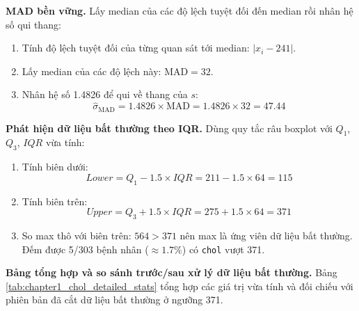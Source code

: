 \noindent\textbf{MAD bền vững.} Lấy median của các độ lệch tuyệt đối đến median rồi nhân hệ số qui thang:
\begin{enumerate}[leftmargin=2.2em,label=\textbf{\arabic*.}]
 \item Tính độ lệch tuyệt đối của từng quan sát tới median: $|x_i-241|$.
 \item Lấy median của các độ lệch này: $\text{MAD}=32$.
 \item Nhân hệ số 1.4826 để qui về thang của $s$:
 \begin{equation}
 \hat{\sigma}_{\text{MAD}} = 1.4826 \times \text{MAD} = 1.4826 \times 32 = 47.44
 \end{equation}
\end{enumerate}

\noindent\textbf{Phát hiện dữ liệu bất thường theo IQR.} Dùng quy tắc râu boxplot với $Q_1$, $Q_3$, $IQR$ vừa tính:
\begin{enumerate}[leftmargin=2.2em,label=\textbf{\arabic*.}]
 \item Tính biên dưới:
 \begin{equation}
 Lower = Q_1 - 1.5\times IQR = 211 - 1.5\times 64 = 115
 \end{equation}
 \item Tính biên trên:
 \begin{equation}
 Upper = Q_3 + 1.5\times IQR = 275 + 1.5\times 64 = 371
 \end{equation}
 \item So max thô với biên trên: $564 > 371$ nên max là ứng viên dữ liệu bất thường. Đếm được 5/303 bệnh nhân ($\approx1.7\%$) có \texttt{chol} vượt 371.
\end{enumerate}

\noindent\textbf{Bảng tổng hợp và so sánh trước/sau xử lý dữ liệu bất thường.} Bảng \ref{tab:chapter1_chol_detailed_stats} tổng hợp các giá trị vừa tính và đối chiếu với phiên bản đã cắt dữ liệu bất thường ở ngưỡng 371.

